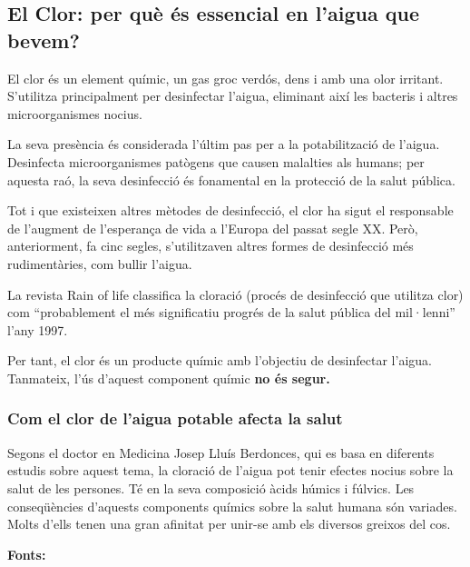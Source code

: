 \subsection{El Clor: per què és essencial en l’aigua que bevem?} \label{subsec:clor}
El clor és un element químic, un gas groc verdós, dens i amb una olor irritant. S'utilitza principalment per desinfectar l'aigua, eliminant així les bacteris i altres microorganismes nocius.

La seva presència és considerada l'últim pas per a la potabilització de l'aigua. Desinfecta microorganismes patògens que causen malalties als humans; per aquesta raó, la seva desinfecció és fonamental en la protecció de la salut pública.

Tot i que existeixen altres mètodes de desinfecció, el clor ha sigut el responsable de l'augment de l'esperança de vida a l'Europa del passat segle XX. Però, anteriorment, fa cinc segles, s'utilitzaven altres formes de desinfecció més rudimentàries, com bullir l'aigua.

La revista Rain of life \cite{RoF} classifica la cloració (procés de desinfecció que utilitza clor) com “probablement el més significatiu progrés de la salut pública del mil·lenni” l'any 1997.

Per tant, el clor és un producte químic amb l'objectiu de desinfectar l'aigua. Tanmateix, l'ús d'aquest component químic \textbf{no és segur.}

\subsubsection{Com el clor de l'aigua potable afecta la salut}
Segons el doctor en Medicina Josep Lluís Berdonces, qui es basa en diferents estudis sobre aquest tema, la cloració de l’aigua pot tenir efectes nocius sobre la salut de les persones. Té en la seva composició àcids húmics i fúlvics. Les conseqüències d’aquests components químics sobre la salut humana són variades. Molts d’ells tenen una gran afinitat per unir-se amb els diversos greixos del cos.

\textbf{Fonts:} \cite{RoF}

